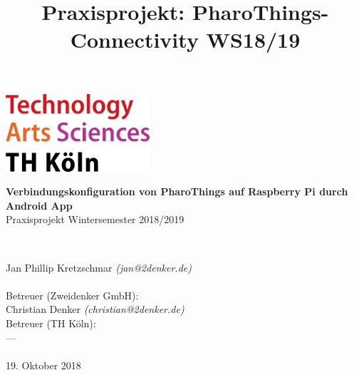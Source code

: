 \documentclass[12pt,a4paper]{article}
\title{Praxisprojekt: PharoThings-Connectivity WS18/19}
\begin{document}
	\begin{titlepage}
    \includegraphics[width=0.4\textwidth]{th_logo.png}
    ~\\[2.5cm]
    \begin{center}
    \textbf{\huge Verbindungskonfiguration von PharoThings auf Raspberry Pi durch Android App}\\[0.5cm]
    {\Large Praxisprojekt Wintersemester 2018/2019}
    \vfill
    \end{center}
    ~\\[2.0cm]
    \begin{flushright}
    {\large Jan Phillip Kretzschmar \it{(jan@2denker.de)}}\\[0.1cm]
    ~\\[1.0cm]
    {\large Betreuer (Zweidenker GmbH):}\\[0.1cm]
    {\large Christian Denker \it{(christian@2denker.de)}}
    ~\\[0.5cm]
    {\large Betreuer (TH Köln):}\\[0.1cm]
    {\large ---}\\[0.1cm]

	~\\[1.0cm]
    {\large 19. Oktober 2018}
	\end{flushright}
    \end{titlepage}
    
\end{document}
